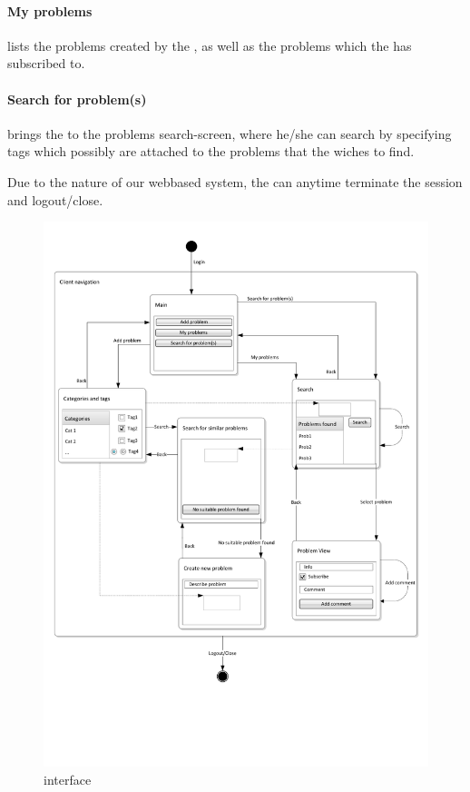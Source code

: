 \paragraph{My problems}lists the problems created by the \aclient[], as well as the problems which the \aclient[] has subscribed to.
\paragraph{Search for problem(s)}brings the \aclient[] to the problems search-screen, where he/she can search by specifying tags which possibly are attached to the problems that the \aclient[] wiches to find.

Due to the nature of our webbased system, the \aclient[] can anytime terminate the session and logout/close.


\begin{figure}[h]
\begin{center}
 \includegraphics[scale=0.70]{input/application_domain_analysis/client_interface}
\caption{\Client[] interface}
\label{fig:client_interface}
\end{center}
\end{figure}

